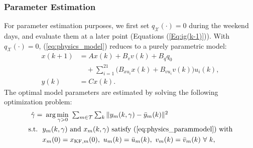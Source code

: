 \subsubsection{Parameter Estimation}
For parameter estimation purposes, we first set $q_{\mathcal{X}}(\cdot) = 0$ during the weekend days, and evaluate them at a later point (Equations (\ref{Eq:ig(k-1)})). With $q_{\mathcal{X}}(\cdot) = 0$, (\ref{eq:physics_model}) reduces to a purely parametric model:
\begin{equation}\label{eq:physics_parammodel}
\begin{aligned}
x(k+1) &= Ax(k)+B_v v(k) + B_q q_0\\
	& \quad + \textstyle \sum_{i=1}^{21} \big( B_{xu_i} x(k) + B_{vu_i} v(k) \big) u_i(k), \\
y(k) &= C x(k).
\end{aligned}
\end{equation}
The optimal model parameters are estimated by solving the following optimization problem:
\begin{equation}\label{eq:physics_opt}
\begin{aligned}
 \hat{\gamma} =&~\arg\min_{\gamma > 0}~\textstyle \sum_{m \in \mathcal{T}} \sum_k \Vert y_m(k,\gamma) - \bar y_m(k) \Vert ^ 2 \\
\text{s.t.~~}
&y_m(k,\gamma) \text{~and~} x_m(k,\gamma) \text{~satisfy (\ref{eq:physics_parammodel}) with}\\
&x_m(0) = x_{\text{KF},m}(0),~u_m(k) = \bar u_m(k), ~v_m(k) = \bar v_m(k)~\forall~k,\\
\end{aligned}
\end{equation}

